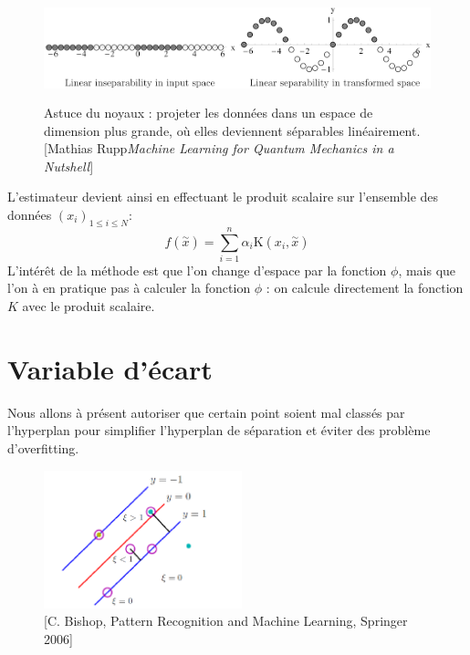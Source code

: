 \documentclass[a4paper,12pt,titlepage]{report}
\begin{document}
\begin{figure}[!h]
	\begin{center}
		\includegraphics[height = 3cm, keepaspectratio]{graphes/separation.png}
		\caption{Astuce du noyaux : projeter les données dans un espace de dimension plus grande, où elles deviennent séparables linéairement.[Mathias Rupp\textit{Machine Learning for Quantum Mechanics in a Nutshell}]}
	\end{center}
\end{figure}

L'estimateur devient ainsi en effectuant le produit scalaire sur l'ensemble des données $(x_{i})_{1 \leqslant i \leqslant N}$:
\[
f(\overset{\sim}{x}) = \sum_{i = 1}^{n}{\alpha_i \text{K}(x_i , \overset{\sim}{x})}
\]	
L'intérêt de la méthode est que l'on change d'espace par la fonction $\phi$, mais que l'on à en pratique pas à calculer la fonction $\phi$ : on calcule directement la fonction $K$ avec le produit scalaire.

\section{Variable d'écart}	

Nous allons à présent autoriser que certain point soient mal classés par l'hyperplan	pour simplifier l'hyperplan de séparation et éviter des problème d'overfitting. 
\begin{figure}[!h]
	\begin{center}
		\includegraphics[height = 4cm, keepaspectratio]{graphes/ecart.png}
		\caption{[C. Bishop, Pattern Recognition and Machine Learning, Springer 2006]}
	\end{center}
\end{figure}
\end{document}
